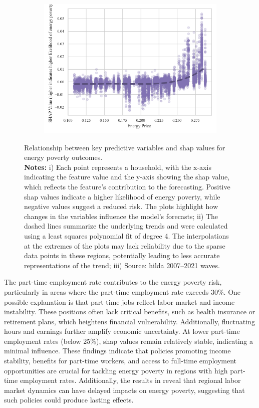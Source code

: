 \documentclass[preprint,authoryear,12pt]{elsarticle}
\begin{document}
\begin{figure}
\begin{subfigure}[b]{0.45\textwidth}
         \includegraphics[width=\textwidth]{Figure4e.png}
     \end{subfigure}
     \caption{Relationship between key predictive variables and \Gls{shap} values for energy poverty outcomes. \\
    \small
    {\bf Notes:} i) Each point represents a household, with the x-axis indicating the feature value and the y-axis showing the \Gls{shap} value, which reflects the feature's contribution to the forecasting. Positive \Gls{shap} values indicate a higher likelihood of energy poverty, while negative values suggest a reduced risk. The plots highlight how changes in the variables influence the model's forecasts; ii) The dashed lines summarize the underlying trends and were calculated using a least squares polynomial fit of degree 4. The interpolations at the extremes of the plots may lack reliability due to the sparse data points in these regions, potentially leading to less accurate representations of the trend; iii) Source: \Gls{hilda} 2007--2021 waves.}
    \label{fig:figure4}
\end{figure}


The part-time employment rate contributes to the energy poverty risk, particularly in areas where the part-time employment rate exceeds 30\%. One possible explanation is that part-time jobs reflect labor market and income instability. These positions often lack critical benefits, such as health insurance or retirement plans, which heightens financial vulnerability. Additionally, fluctuating hours and earnings further amplify economic uncertainty. At lower part-time employment rates (below 25\%), \Gls{shap} values remain relatively stable, indicating a minimal influence. These findings indicate that policies promoting income stability, benefits for part-time workers, and access to full-time employment opportunities are crucial for tackling energy poverty in regions with high part-time employment rates. Additionally, the results in  reveal that regional labor market dynamics can have delayed impacts on energy poverty, suggesting that such policies could produce lasting effects. 
\end{document}
